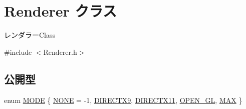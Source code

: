 \hypertarget{class_renderer}{}\section{Renderer クラス}
\label{class_renderer}


レンダラー\+Class  




{\ttfamily \#include $<$Renderer.\+h$>$}

\subsection*{公開型}
\begin{DoxyCompactItemize}
\item 
enum \mbox{\hyperlink{class_renderer_ab5a9379ccadcf2b3394c61cf8c835fec}{M\+O\+DE}} \{ \newline
\mbox{\hyperlink{class_renderer_ab5a9379ccadcf2b3394c61cf8c835feca2a36637bde744b1f383e4fa8c3c10382}{N\+O\+NE}} = -\/1, 
\mbox{\hyperlink{class_renderer_ab5a9379ccadcf2b3394c61cf8c835feca6b296a07c01bb9de6258ca507e7c4eb6}{D\+I\+R\+E\+C\+T\+X9}}, 
\mbox{\hyperlink{class_renderer_ab5a9379ccadcf2b3394c61cf8c835fecaf72f39863653ad6fe6cb501a566fb714}{D\+I\+R\+E\+C\+T\+X11}}, 
\mbox{\hyperlink{class_renderer_ab5a9379ccadcf2b3394c61cf8c835fecac532ec7ed1c2ce77df467cbf829e575a}{O\+P\+E\+N\+\_\+\+GL}}, 
\newline
\mbox{\hyperlink{class_renderer_ab5a9379ccadcf2b3394c61cf8c835feca3304c74929f96df4042bc148ee9f3b50}{M\+AX}}
 \}
\end{DoxyCompactItemize}
